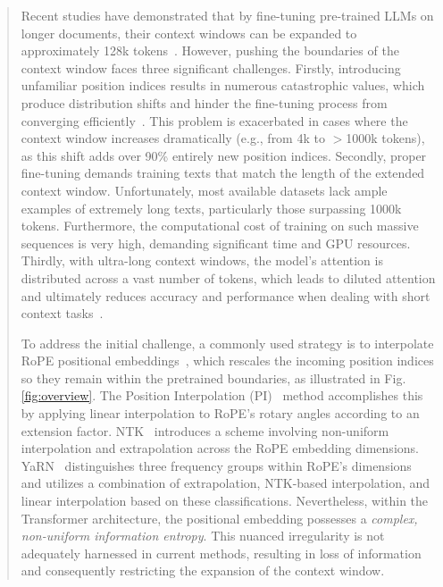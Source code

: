 \begin{abstract}
Recent studies have demonstrated that by fine-tuning pre-trained LLMs on longer documents, their context windows can be expanded to approximately 128k tokens~\cite{longlora,pi,yarn,zhang2024soaring,liu2023scaling}. However, pushing the boundaries of the context window faces three significant challenges. Firstly, introducing unfamiliar position indices results in numerous catastrophic values, which produce distribution shifts and hinder the fine-tuning process from converging efficiently~\cite{pi}. This problem is exacerbated in cases where the context window increases dramatically (e.g., from 4k to $>$1000k tokens), as this shift adds over 90\% entirely new position indices. Secondly, proper fine-tuning demands training texts that match the length of the extended context window. Unfortunately, most available datasets lack ample examples of extremely long texts, particularly those surpassing 1000k tokens. Furthermore, the computational cost of training on such massive sequences is very high, demanding significant time and GPU resources. Thirdly, with ultra-long context windows, the model’s attention is distributed across a vast number of tokens, which leads to diluted attention and ultimately reduces accuracy and performance when dealing with short context tasks~\cite{pi}.

To address the initial challenge, a commonly used strategy is to interpolate RoPE positional embeddings~\cite{rope,pi}, which rescales the incoming position indices so they remain within the pretrained boundaries, as illustrated in Fig.\ref{fig:overview}. The Position Interpolation (PI)~\cite{pi} method accomplishes this by applying linear interpolation to RoPE's rotary angles according to an extension factor. NTK~\cite{ntk,dynamicntk} introduces a scheme involving non-uniform interpolation and extrapolation across the RoPE embedding dimensions. YaRN~\cite{yarn} distinguishes three frequency groups within RoPE's dimensions and utilizes a combination of extrapolation, NTK-based interpolation, and linear interpolation based on these classifications. Nevertheless, within the Transformer architecture, the positional embedding possesses a \emph{complex, non-uniform information entropy}. This nuanced irregularity is not adequately harnessed in current methods, resulting in loss of information and consequently restricting the expansion of the context window.


\end{abstract}
